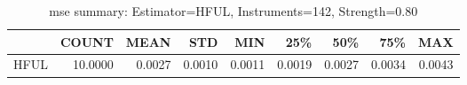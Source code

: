 \begin{table}[ht]
\centering
\caption{mse summary: Estimator=HFUL, Instruments=142, Strength=0.80}
\begin{tabular}{lrrrrrrrr}
\toprule
 & COUNT & MEAN & STD & MIN & 25\% & 50\% & 75\% & MAX \\
\midrule
HFUL & 10.0000 & 0.0027 & 0.0010 & 0.0011 & 0.0019 & 0.0027 & 0.0034 & 0.0043 \\
\bottomrule
\end{tabular}
\end{table}
